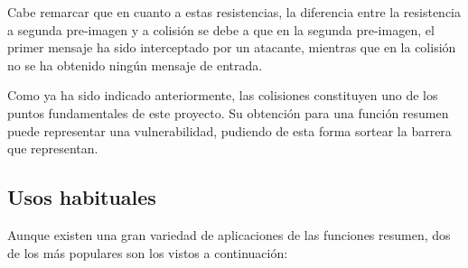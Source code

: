 \documentclass[12pt,spanish,listoffigures,listoftables,listofalgorithms]{tfgetsinf}
\begin{document}
Cabe remarcar que en cuanto a estas resistencias, la diferencia entre la resistencia a segunda pre-imagen y a colisión se debe a que en la segunda pre-imagen, el primer mensaje ha sido interceptado por un atacante, mientras que en la colisión no se ha obtenido ningún mensaje de entrada.

Como ya ha sido indicado anteriormente, las colisiones constituyen uno de los puntos fundamentales de este proyecto. Su obtención para una función resumen puede representar una vulnerabilidad, pudiendo de esta forma sortear la barrera que representan.

\subsection{Usos habituales}

Aunque existen una gran variedad de aplicaciones de las funciones resumen, dos de los más populares son los vistos a continuación:
\end{document}
